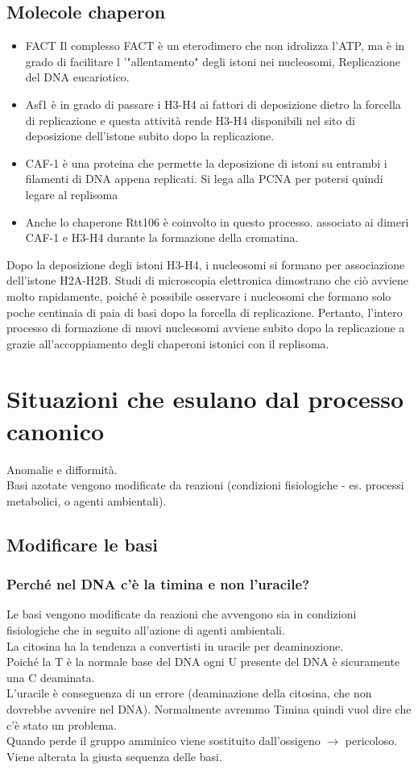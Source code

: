 \documentclass{article}
\begin{document}
\subsection{Molecole chaperon} 
\begin{itemize}
    \item FACT Il complesso FACT è un eterodimero che non idrolizza l'ATP,
    ma è in grado di facilitare l '"allentamento" degli istoni nei nucleosomi,
    Replicazione del DNA eucariotico.
    \item Asf1 è in grado di passare i H3-H4 ai fattori
    di deposizione dietro la forcella di
    replicazione e questa attività rende H3-H4
    disponibili nel sito di deposizione dell'istone
    subito dopo la replicazione.
    \item CAF-1 è una proteina che
    permette la deposizione di istoni
    su entrambi i filamenti di DNA
    appena replicati. Si lega alla
    PCNA per potersi quindi legare al
    replisoma
    \item Anche lo chaperone Rtt106
    è coinvolto in questo
    processo. associato ai
    dimeri CAF-1 e H3-H4
    durante la formazione della
    cromatina.
\end{itemize}
Dopo la deposizione degli istoni H3-H4, i nucleosomi si formano per associazione dell'istone H2A-H2B.
Studi di microscopia elettronica dimostrano che ciò avviene molto rapidamente, poiché è possibile osservare i
nucleosomi che formano solo poche centinaia di paia di basi dopo la forcella di replicazione.
Pertanto, l'intero processo di formazione di nuovi nucleosomi avviene subito dopo la replicazione a grazie
all'accoppiamento degli chaperoni istonici con il replisoma.
\section{Situazioni che esulano dal processo canonico} Anomalie e difformità.\\Basi azotate vengono modificate da reazioni (condizioni fisiologiche - es. processi metabolici, o agenti ambientali).
\subsection{Modificare le basi} 
\subsubsection{Perché nel DNA c'è la timina e non l'uracile?}
Le basi vengono modificate da reazioni che avvengono sia in condizioni fisiologiche che in seguito all'azione di agenti ambientali.\\
La citosina ha la tendenza a convertisti in uracile per deaminozione.\\
Poiché la T è la normale base del DNA ogni U presente del DNA è sicuramente una C deaminata.\\
L'uracile è conseguenza di un errore (deaminazione della citosina, che non dovrebbe avvenire nel DNA). Normalmente avremmo Timina quindi vuol dire che c'è stato un problema.\\
Quando perde il gruppo amminico viene sostituito dall'ossigeno $\rightarrow$ pericoloso. Viene alterata la giusta sequenza delle basi.\\
\end{document}
